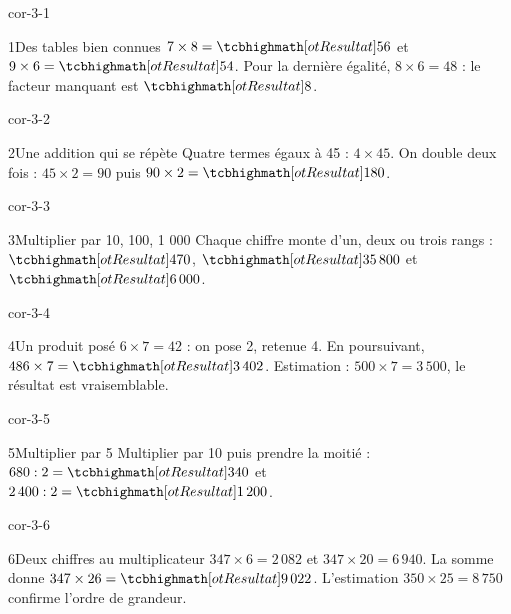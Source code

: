 \clearpage\pagestyle{otMain}\setlength{\otBlocEspacement}{2.5mm}\fontsize{11}{15}\selectfont{}
\begin{blocLivre}{cor-3-1}\begin{corrige}{1}{Des tables bien connues}
$7\times8=\res{56}$ et $9\times6=\res{54}$. Pour la dernière égalité, $8\times6=48$ : le facteur manquant est $\res8$.
\end{corrige}\end{blocLivre}
\begin{blocLivre}{cor-3-2}\begin{corrige}{2}{Une addition qui se répète}
Quatre termes égaux à 45 : $4\times45$. On double deux fois : $45\times2=90$ puis $90\times2=\res{180}$.
\end{corrige}\end{blocLivre}
\begin{blocLivre}{cor-3-3}\begin{corrige}{3}{Multiplier par 10, 100, 1 000}
Chaque chiffre monte d’un, deux ou trois rangs : $\res{470}$, $\res{35\,800}$ et $\res{6\,000}$.
\end{corrige}\end{blocLivre}
\begin{blocLivre}{cor-3-4}\begin{corrige}{4}{Un produit posé}
$6\times7=42$ : on pose 2, retenue 4. En poursuivant, $486\times7=\res{3\,402}$. Estimation : $500\times7=3\,500$, le résultat est vraisemblable.
\end{corrige}\end{blocLivre}
\begin{blocLivre}{cor-3-5}\begin{corrige}{5}{Multiplier par 5}
Multiplier par 10 puis prendre la moitié : $680:2=\res{340}$ et $2\,400:2=\res{1\,200}$.
\end{corrige}\end{blocLivre}
\begin{blocLivre}{cor-3-6}\begin{corrige}{6}{Deux chiffres au multiplicateur}
$347\times6=2\,082$ et $347\times20=6\,940$. La somme donne $347\times26=\res{9\,022}$. L’estimation $350\times25=8\,750$ confirme l’ordre de grandeur.
\end{corrige}\end{blocLivre}
